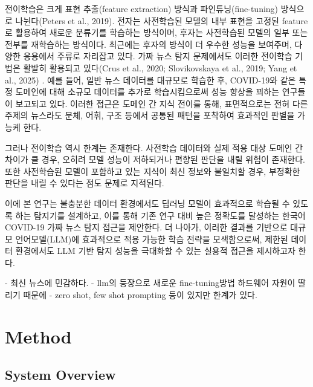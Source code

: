 \documentclass[a4paper,fleqn]{cas-sc}
\begin{document}
전이학습은 크게 표현 추출(feature extraction) 방식과 파인튜닝(fine-tuning) 방식으로 나뉜다(Peters et al., 2019). 전자는 사전학습된 모델의 내부 표현을 고정된 feature로 활용하여 새로운 분류기를 학습하는 방식이며, 후자는 사전학습된 모델의 일부 또는 전부를 재학습하는 방식이다. 최근에는 후자의 방식이 더 우수한 성능을 보여주며, 다양한 응용에서 주류로 자리잡고 있다.
가짜 뉴스 탐지 문제에서도 이러한 전이학습 기법은 활발히 활용되고 있다(Crus et al., 2020; Slovikovskaya et al., 2019; Yang et al., 2025) . 예를 들어, 일반 뉴스 데이터를 대규모로 학습한 후, COVID-19와 같은 특정 도메인에 대해 소규모 데이터를 추가로 학습시킴으로써 성능 향상을 꾀하는 연구들이 보고되고 있다. 이러한 접근은 도메인 간 지식 전이를 통해, 표면적으로는 전혀 다른 주제의 뉴스라도 문체, 어휘, 구조 등에서 공통된 패턴을 포착하여 효과적인 판별을 가능케 한다.

그러나 전이학습 역시 한계는 존재한다. 사전학습 데이터와 실제 적용 대상 도메인 간 차이가 클 경우, 오히려 모델 성능이 저하되거나 편향된 판단을 내릴 위험이 존재한다. 또한 사전학습된 모델이 포함하고 있는 지식이 최신 정보와 불일치할 경우, 부정확한 판단을 내릴 수 있다는 점도 문제로 지적된다. 

이에 본 연구는 불충분한 데이터 환경에서도 딥러닝 모델이 효과적으로 학습될 수 있도록 하는 탐지기를 설계하고, 이를 통해 기존 연구 대비 높은 정확도를 달성하는 한국어 COVID-19 가짜 뉴스 탐지 접근을 제안한다. 더 나아가, 이러한 결과를 기반으로 대규모 언어모델(LLM)에 효과적으로 적용 가능한 학습 전략을 모색함으로써, 제한된 데이터 환경에서도 LLM 기반 탐지 성능을 극대화할 수 있는 실용적 접근을 제시하고자 한다.



- 최신 뉴스에 민감하다.
- llm의 등장으로 새로운 fine-tuning방법 하드웨어 자원이 딸리기 때문에
- zero shot, few shot prompting 등이 있지만 한계가 있다.




\section{Method}


\subsection{System Overview}
\end{document}
